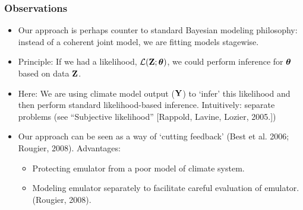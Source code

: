 \documentclass{beamer}
\begin{document}
\begin{frame}
  \frametitle{Observations}
    \begin{itemize}
    \item Our approach is perhaps counter to standard Bayesian modeling philosophy: instead of a coherent joint model, we are fitting models stagewise.
    \item Principle: If we had a likelihood, ${\mathcal
        L}({\bf Z} ;\mbox{\boldmath $\theta$})$, we could perform inference for $\mbox{\boldmath $\theta$}$ based on data ${\bf Z}$.
    \item Here: We are using climate model output (${\bf Y}$) to `infer'
      this likelihood and then perform standard likelihood-based
      inference. Intuitively: separate problems (see ``Subjective
      likelihood'' [Rappold, Lavine, Lozier, 2005.])
    \item Our approach can be seen as a way of `cutting feedback' (Best et al. 2006; Rougier, 2008). Advantages:
      \begin{itemize}  
      \item Protecting emulator from a poor model of climate system. %
      \item Modeling emulator separately to facilitate careful evaluation of emulator. (Rougier, 2008).
      \end{itemize}
    \end{itemize}
\end{frame}
\end{document}
